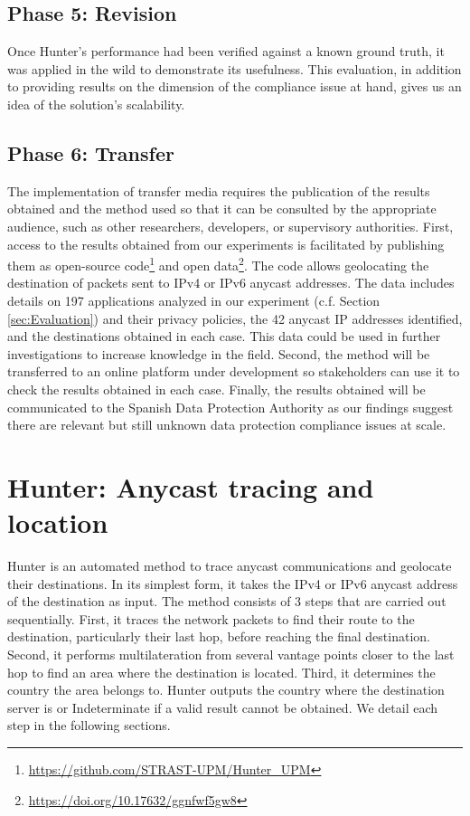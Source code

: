 \documentclass[preprint,12pt]{elsarticle}
\begin{document}
\subsection{Phase 5: Revision}
Once Hunter's performance had been verified against a known ground truth, it was applied in the wild to demonstrate its usefulness. This evaluation, in addition to providing results on the dimension of the compliance issue at hand, gives us an idea of the solution's scalability.

\subsection{Phase 6: Transfer}
The implementation of transfer media requires the publication of the results obtained and the method used so that it can be consulted by the appropriate audience, such as other researchers, developers, or supervisory authorities. First, access to the results obtained from our experiments is facilitated by publishing them as open-source code\footnote{\url{https://github.com/STRAST-UPM/Hunter_UPM}} and open data\footnote{\url{https://doi.org/10.17632/ggnfwf5gw8}}. The code allows geolocating the destination of packets sent to IPv4 or IPv6 anycast addresses. The data includes details on 197 applications analyzed in our experiment (c.f. Section \ref{sec:Evaluation}) and their privacy policies, the 42 anycast IP addresses identified, and the destinations obtained in each case. This data could be used in further investigations to increase knowledge in the field. Second, the method will be transferred to an online platform under development so stakeholders can use it to check the results obtained in each case. Finally, the results obtained will be communicated to the Spanish Data Protection Authority as our findings suggest there are relevant but still unknown data protection compliance issues at scale.

\section{Hunter: Anycast tracing and location}
Hunter is an automated method to trace anycast communications and geolocate their destinations. In its simplest form, it takes the IPv4 or IPv6 anycast address of the destination as input. The method consists of 3 steps that are carried out sequentially. First, it traces the network packets to find their route to the destination, particularly their last hop, before reaching the final destination. Second, it performs multilateration from several vantage points closer to the last hop to find an area where the destination is located. Third, it determines the country the area belongs to. Hunter outputs the country where the destination server is or Indeterminate if a valid result cannot be obtained. We detail each step in the following sections.
\end{document}
